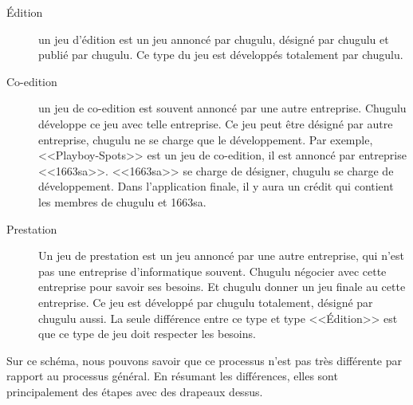 \begin{description}
	\item[Édition] un jeu d'édition est un jeu annoncé par chugulu, désigné par chugulu et publié par chugulu. Ce type du jeu est développés totalement par chugulu.
	\item[Co-edition] un jeu de co-edition est souvent annoncé par une autre entreprise. Chugulu développe ce jeu avec telle entreprise. Ce jeu peut être désigné par autre entreprise, chugulu ne se charge que le développement. Par exemple, <<Playboy-Spots>> est un jeu de co-edition, il est annoncé par entreprise <<1663sa>>. <<1663sa>> se charge de désigner, chugulu se charge de développement. Dans l'application finale, il y aura un crédit qui contient les membres de chugulu et 1663sa.
	\item[Prestation] Un jeu de prestation est un jeu annoncé par une autre entreprise, qui n'est pas une entreprise d'informatique souvent. Chugulu négocier avec cette entreprise pour savoir ses besoins. Et chugulu donner un jeu finale au cette entreprise. Ce jeu est développé par chugulu totalement, désigné par chugulu aussi. La seule différence entre ce type et type <<Édition>> est que ce type de jeu doit respecter les besoins.
\end{description}

Sur ce schéma, nous pouvons savoir que ce processus n'est pas très différente par rapport au processus général. En résumant les différences, elles sont principalement des étapes avec des drapeaux dessus. 



